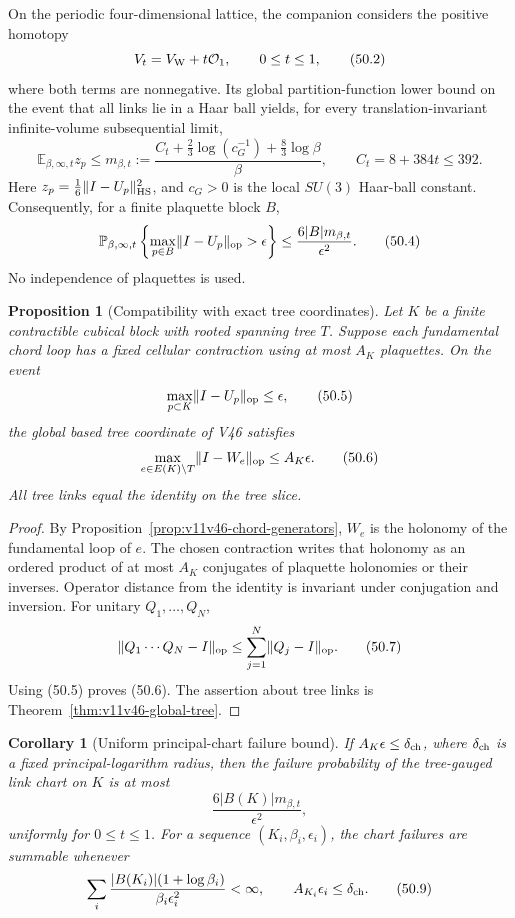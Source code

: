 \documentclass[11pt]{article}
\newtheorem{proposition}[theorem]{Proposition}
\newtheorem{corollary}[theorem]{Corollary}
\begin{document}
On the periodic four-dimensional lattice, the companion considers
the positive homotopy
\[
 V_t=V_{\rm W}+t{\cal O}_1,\qquad 0\le t\le1,                 \tag{50.2}
\]
where both terms are nonnegative.  Its global partition-function lower
bound on the event that all links lie in a Haar ball yields, for every
translation-invariant infinite-volume subsequential limit,
\[
 {\mathbb E}_{\beta,\infty,t}z_p
 \le m_{\beta,t}
 :=\frac{C_t+\frac23\log(c_G^{-1})+\frac83\log\beta}{\beta},
 \qquad C_t=8+384t\le392.                                    \tag{50.3}
\]
Here \(z_p=\frac16\lVert I-U_p\rVert_{\rm HS}^2\), and \(c_G>0\)
is the local \(SU(3)\) Haar-ball constant.  Consequently, for a finite
plaquette block \(B\),
\[
 \mathbb P_{\beta,\infty,t}
 \left\{\max_{p\in B}\lVert I-U_p\rVert_{\rm op}>\epsilon\right\}
 \le\frac{6|B|m_{\beta,t}}{\epsilon^2}.                       \tag{50.4}
\]
No independence of plaquettes is used.

\begin{proposition}[Compatibility with exact tree coordinates]
\label{prop:v11v50-compatible}
Let \(K\) be a finite contractible cubical block with rooted spanning
tree \(T\).  Suppose each fundamental chord loop has a fixed cellular
contraction using at most \(A_K\) plaquettes.  On the event
\[
                   \max_{p\subset K}
                   \lVert I-U_p\rVert_{\rm op}\le\epsilon,     \tag{50.5}
\]
the global based tree coordinate of V46 satisfies
\[
                    \max_{e\in E(K)\setminus T}
                    \lVert I-W_e\rVert_{\rm op}
                    \le A_K\epsilon.                          \tag{50.6}
\]
All tree links equal the identity on the tree slice.
\end{proposition}

\begin{proof}
By Proposition~\ref{prop:v11v46-chord-generators}, \(W_e\) is the
holonomy of the fundamental loop of \(e\).  The chosen contraction
writes that holonomy as an ordered product of at most \(A_K\)
conjugates of plaquette holonomies or their inverses.  Operator distance
from the identity is invariant under conjugation and inversion.
For unitary \(Q_1,\ldots,Q_N\),
\[
 \lVert Q_1\cdots Q_N-I\rVert_{\rm op}
 \le\sum_{j=1}^N\lVert Q_j-I\rVert_{\rm op}.                  \tag{50.7}
\]
Using (50.5) proves (50.6).  The assertion about tree links is
Theorem~\ref{thm:v11v46-global-tree}.
\end{proof}

\begin{corollary}[Uniform principal-chart failure bound]
\label{cor:v11v50-chart}
If \(A_K\epsilon\le\delta_{\rm ch}\), where
\(\delta_{\rm ch}\) is a fixed principal-logarithm radius, then the
failure probability of the tree-gauged link chart on \(K\) is at most
\[
                         \frac{6|B(K)|m_{\beta,t}}{\epsilon^2},\tag{50.8}
\]
uniformly for \(0\le t\le1\).  For a sequence
\((K_i,\beta_i,\epsilon_i)\), the chart failures are summable whenever
\[
 \sum_i\frac{|B(K_i)|(1+\log\beta_i)}
                 {\beta_i\epsilon_i^2}<\infty,\qquad
                         A_{K_i}\epsilon_i\le\delta_{\rm ch}. \tag{50.9}
\]
\end{corollary}
\end{document}
